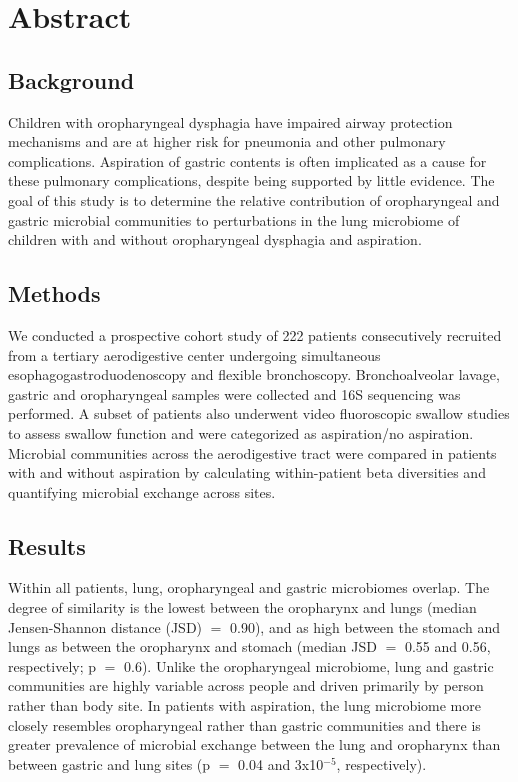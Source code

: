 
\section{Abstract}

\subsection{Background}

Children with oropharyngeal dysphagia have impaired airway protection mechanisms and are at higher risk for pneumonia and other pulmonary complications.
Aspiration of gastric contents is often implicated as a cause for these pulmonary complications, despite being supported by little evidence.
The goal of this study is to determine the relative contribution of oropharyngeal and gastric microbial communities to perturbations in the lung microbiome of children with and without oropharyngeal dysphagia and aspiration.

\subsection{Methods}

We conducted a prospective cohort study of 222 patients consecutively recruited from a tertiary aerodigestive center undergoing simultaneous esophagogastroduodenoscopy and flexible bronchoscopy.
Bronchoalveolar lavage, gastric and oropharyngeal samples were collected and 16S sequencing was performed.
A subset of patients also underwent video fluoroscopic swallow studies to assess swallow function and were categorized as aspiration/no aspiration.
Microbial communities across the aerodigestive tract were compared in patients with and without aspiration by calculating within-patient beta diversities and quantifying microbial exchange across sites.

\subsection{Results}

Within all patients, lung, oropharyngeal and gastric microbiomes overlap.
The degree of similarity is the lowest between the oropharynx and lungs (median Jensen-Shannon distance (JSD) $=$ 0.90), and as high between the stomach and lungs as between the oropharynx and stomach (median JSD $=$ 0.55 and 0.56, respectively; p $=$ 0.6).
Unlike the oropharyngeal microbiome, lung and gastric communities are highly variable across people and driven primarily by person rather than body site.
In patients with aspiration, the lung microbiome more closely resembles oropharyngeal rather than gastric communities and there is greater prevalence of microbial exchange between the lung and oropharynx than between gastric and lung sites (p $=$ 0.04 and 3x10$^{-5}$, respectively).

